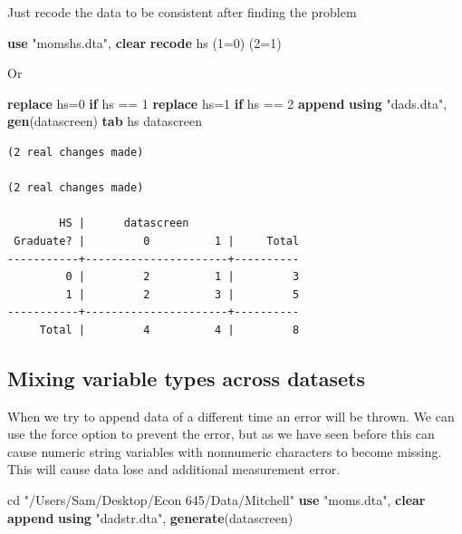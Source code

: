 \documentclass[
]{book}
\newenvironment{Shaded}{\begin{snugshade}}{\end{snugshade}}
\newcommand{\KeywordTok}[1]{\textcolor[rgb]{0.13,0.29,0.53}{\textbf{#1}}}
\newcommand{\NormalTok}[1]{#1}
\newcommand{\StringTok}[1]{\textcolor[rgb]{0.31,0.60,0.02}{#1}}
\begin{document}
Just recode the data to be consistent after finding the problem

\begin{Shaded}
\begin{Highlighting}[]
\KeywordTok{use} \StringTok{"momshs.dta"}\NormalTok{, }\KeywordTok{clear}
\KeywordTok{recode}\NormalTok{ hs (1=0) (2=1)}
\end{Highlighting}
\end{Shaded}

Or

\begin{Shaded}
\begin{Highlighting}[]
\KeywordTok{replace}\NormalTok{ hs=0 }\KeywordTok{if}\NormalTok{ hs == 1}
\KeywordTok{replace}\NormalTok{ hs=1 }\KeywordTok{if}\NormalTok{ hs == 2}
\KeywordTok{append} \KeywordTok{using} \StringTok{"dads.dta"}\NormalTok{, }\KeywordTok{gen}\NormalTok{(datascreen)}
\KeywordTok{tab}\NormalTok{ hs datascreen}
\end{Highlighting}
\end{Shaded}

\begin{verbatim}
(2 real changes made)

(2 real changes made)

        HS |      datascreen
 Graduate? |         0          1 |     Total
-----------+----------------------+----------
         0 |         2          1 |         3 
         1 |         2          3 |         5 
-----------+----------------------+----------
     Total |         4          4 |         8 
\end{verbatim}

\subsection{Mixing variable types across datasets}\label{mixing-variable-types-across-datasets}

When we try to append data of a different time an error will be thrown. We can use the force option to prevent the error, but as we have seen before this can cause numeric string variables with nonnumeric characters to become missing. This will cause data lose and additional measurement error.

\begin{Shaded}
\begin{Highlighting}[]
\NormalTok{cd }\StringTok{"/Users/Sam/Desktop/Econ 645/Data/Mitchell"}
\KeywordTok{use} \StringTok{"moms.dta"}\NormalTok{, }\KeywordTok{clear}
\KeywordTok{append} \KeywordTok{using} \StringTok{"dadstr.dta"}\NormalTok{, }\KeywordTok{generate}\NormalTok{(datascreen)}
\end{Highlighting}
\end{Shaded}
\end{document}
